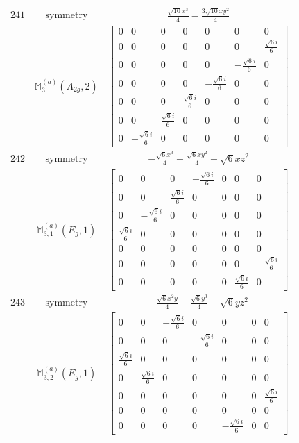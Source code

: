 \documentclass[fleqn,8pt,landscape]{jsarticle}
\begin{document}
\begin{longtable}{ccc}
$ 241 $ & $ \text{symmetry} $ & $ \frac{\sqrt{10} x^{3}}{4} - \frac{3 \sqrt{10} x y^{2}}{4} $ \\
$  $ & $ \mathbb{M}_{3}^{(a)}(A_{2g},2) $ & $ \begin{bmatrix} 0 & 0 & 0 & 0 & 0 & 0 & 0 \\ 0 & 0 & 0 & 0 & 0 & 0 & \frac{\sqrt{6} i}{6} \\ 0 & 0 & 0 & 0 & 0 & - \frac{\sqrt{6} i}{6} & 0 \\ 0 & 0 & 0 & 0 & - \frac{\sqrt{6} i}{6} & 0 & 0 \\ 0 & 0 & 0 & \frac{\sqrt{6} i}{6} & 0 & 0 & 0 \\ 0 & 0 & \frac{\sqrt{6} i}{6} & 0 & 0 & 0 & 0 \\ 0 & - \frac{\sqrt{6} i}{6} & 0 & 0 & 0 & 0 & 0 \end{bmatrix} $ \\ \hline
$ 242 $ & $ \text{symmetry} $ & $ - \frac{\sqrt{6} x^{3}}{4} - \frac{\sqrt{6} x y^{2}}{4} + \sqrt{6} x z^{2} $ \\
$  $ & $ \mathbb{M}_{3,1}^{(a)}(E_{g},1) $ & $ \begin{bmatrix} 0 & 0 & 0 & - \frac{\sqrt{6} i}{6} & 0 & 0 & 0 \\ 0 & 0 & \frac{\sqrt{6} i}{6} & 0 & 0 & 0 & 0 \\ 0 & - \frac{\sqrt{6} i}{6} & 0 & 0 & 0 & 0 & 0 \\ \frac{\sqrt{6} i}{6} & 0 & 0 & 0 & 0 & 0 & 0 \\ 0 & 0 & 0 & 0 & 0 & 0 & 0 \\ 0 & 0 & 0 & 0 & 0 & 0 & - \frac{\sqrt{6} i}{6} \\ 0 & 0 & 0 & 0 & 0 & \frac{\sqrt{6} i}{6} & 0 \end{bmatrix} $ \\ \hline
$ 243 $ & $ \text{symmetry} $ & $ - \frac{\sqrt{6} x^{2} y}{4} - \frac{\sqrt{6} y^{3}}{4} + \sqrt{6} y z^{2} $ \\
$  $ & $ \mathbb{M}_{3,2}^{(a)}(E_{g},1) $ & $ \begin{bmatrix} 0 & 0 & - \frac{\sqrt{6} i}{6} & 0 & 0 & 0 & 0 \\ 0 & 0 & 0 & - \frac{\sqrt{6} i}{6} & 0 & 0 & 0 \\ \frac{\sqrt{6} i}{6} & 0 & 0 & 0 & 0 & 0 & 0 \\ 0 & \frac{\sqrt{6} i}{6} & 0 & 0 & 0 & 0 & 0 \\ 0 & 0 & 0 & 0 & 0 & 0 & \frac{\sqrt{6} i}{6} \\ 0 & 0 & 0 & 0 & 0 & 0 & 0 \\ 0 & 0 & 0 & 0 & - \frac{\sqrt{6} i}{6} & 0 & 0 \end{bmatrix} $ \\ \hline

\end{longtable}
\end{document}
